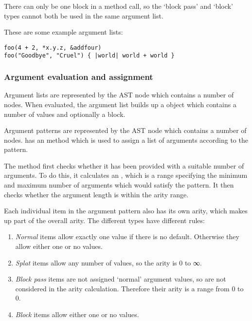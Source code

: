 There can only be one block in a method call, so the `block pass' and `block' types cannot both be used in the same argument list.

These are some example argument lists:

\begin{lstlisting}
foo(4 + 2, *x.y.z, &addfour)
foo("Goodbye", "Cruel") { |world| world + world }
\end{lstlisting}

\subsubsection{Argument evaluation and assignment}

Argument lists are represented by the  AST node which contains a number of \-\- nodes. When evaluated, the argument list builds up a  object which contains a number of values and optionally a block.

Argument patterns are represented by the  AST node which contains a number of \-\- nodes.  has an  method which is used to assign a list of arguments according to the pattern.

The  method first checks whether it has been provided with a suitable number of arguments. To do this, it calculates an , which is a range specifying the minimum and maximum number of arguments which would satisfy the pattern. It then checks whether the argument length is within the arity range.

Each individual item in the argument pattern also has its own arity, which makes up part of the overall arity. The different types have different rules:

\begin{enumerate}
  \item \textit{Normal} items allow exactly one value if there is no default. Otherwise they allow either one or no values.
  \item \textit{Splat} items allow any number of values, so the arity is 0 to ∞.
  \item \textit{Block pass} items are not assigned `normal' argument values, so are not considered in the arity calculation. Therefore their arity is a range from 0 to 0.
  \item \textit{Block} items allow either one or no values.
\end{enumerate}

